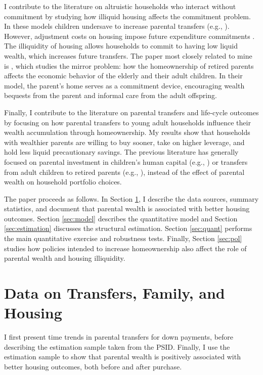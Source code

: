 \documentclass[12pt]{article}
\begin{document}
I contribute to the literature on altruistic households who interact without commitment by studying how illiquid housing affects the commitment problem. In these models children undersave to increase parental transfers (e.g., \citealp{Altonji1997a,Boar2018,Barczyk2014,Chu2020}). However, adjustment costs on housing impose future expenditure commitments \citep{Chetty2007,Shore2010}. The illiquidity of housing allows households to commit to having low liquid wealth, which increases future transfers. The paper most closely related to mine is \cite{Barczyk2020a}, which studies the mirror problem: how the homeownership of retired parents affects the economic behavior of the elderly and their adult children. In their model, the parent’s home serves as a commitment device, encouraging wealth bequests from the parent and informal care from the adult offspring.

Finally, I contribute to the literature on parental transfers and life-cycle outcomes by focusing on how parental transfers to young adult households influence their wealth accumulation through homeownership. My results show that households with wealthier parents are willing to buy sooner, take on higher leverage, and hold less liquid precautionary savings. The previous literature has generally focused on parental investment in children's human capital (e.g., \citealp{Lee2019,Daruich2018,gilraine2023public}) or transfers from adult children to retired parents (e.g., \citealp{Mommaerts2016, Barczyk2018, Barczyk2020a}), instead of the effect of parental wealth on household portfolio choices. 

The paper proceeds as follows. In Section \ref{sec:data}, I describe the data sources, summary statistics, and document that parental wealth is associated with better housing outcomes. Section \ref{sec:model} describes the quantitative model and Section \ref{sec:estimation} discusses the structural estimation. Section \ref{sec:quant} performs the main quantitative exercise and robustness tests. Finally, Section \ref{sec:pol} studies how policies intended to increase homeownership also affect the role of parental wealth and housing illiquidity.

\section{Data on Transfers, Family, and Housing}\label{sec:data}
I first present time trends in parental transfers for down payments, before describing the estimation sample taken from the PSID. Finally, I use the estimation sample to show that parental wealth is positively associated with better housing outcomes, both before and after purchase.
\end{document}

